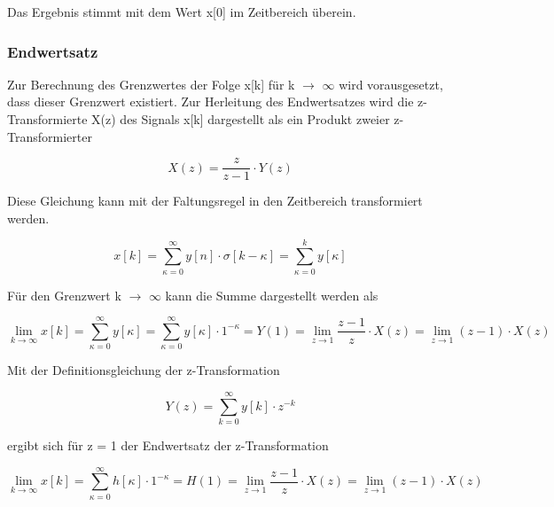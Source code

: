 \noindent Das Ergebnis stimmt mit dem Wert x[0] im Zeitbereich \"{u}berein. 

\clearpage

\subsubsection{Endwertsatz}

\noindent Zur Berechnung des Grenzwertes der Folge x[k] f\"{u}r k $\rightarrow$ $\infty$ wird vorausgesetzt, dass dieser Grenzwert existiert. Zur Herleitung des Endwertsatzes wird die z-Transformierte X(z) des Signals x[k] dargestellt als ein Produkt zweier z-Transformierter

\begin{equation}\label{eq:fiveseventyfive}
X\left(z\right)=\frac{z}{z-1} \cdot Y\left(z\right)
\end{equation}

\noindent Diese Gleichung kann mit der Faltungsregel in den Zeitbereich transformiert werden.

\begin{equation}\label{eq:fiveseventysix}
x\left[k\right]=\sum _{\kappa =0}^{\infty }y\left[n\right]\cdot \sigma \left[k-\kappa \right] =\sum _{\kappa =0}^{k}y\left[\kappa \right]
\end{equation}

\noindent F\"{u}r den Grenzwert k $\rightarrow$ $\infty$ kann die Summe dargestellt werden als

\begin{equation}\label{eq:fiveseventyseven}
{\mathop{\lim }\limits_{k\to \infty }} x\left[k\right]=\sum _{\kappa =0}^{\infty }y\left[\kappa \right] =\sum _{\kappa =0}^{\infty }y\left[\kappa \right] \cdot 1^{-\kappa } =Y\left(1\right)={\mathop{\lim }\limits_{z\to 1}} \frac{z-1}{z} \cdot X\left(z\right)={\mathop{\lim }\limits_{z\to 1}} \left(z-1\right)\cdot X\left(z\right)
\end{equation}

\noindent Mit der Definitionsgleichung der z-Transformation 

\begin{equation}\label{eq:fiveseventyeight}
Y\left(z\right)=\sum _{k=0}^{\infty }y\left[k\right]\cdot z^{-k}
\end{equation}

\noindent ergibt sich f\"{u}r z = 1 der Endwertsatz der z-Transformation

\begin{equation}\label{eq:fiveseventynine}
{\mathop{\lim }\limits_{k\to \infty }} x\left[k\right]=\sum _{\kappa =0}^{\infty }h\left[\kappa \right] \cdot 1^{-\kappa } =H\left(1\right)={\mathop{\lim }\limits_{z\to 1}} \frac{z-1}{z} \cdot X\left(z\right)={\mathop{\lim }\limits_{z\to 1}} \left(z-1\right)\cdot X\left(z\right)
\end{equation}

